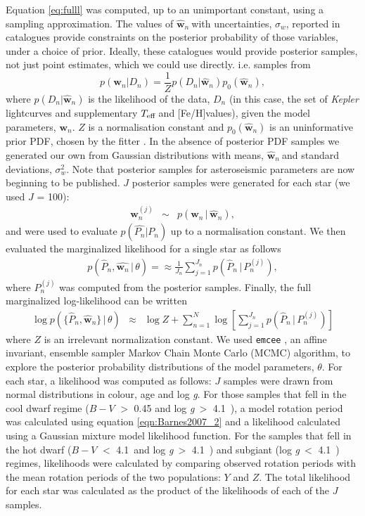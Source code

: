\documentclass[11pt,preprint]{aastex}
\newcommand{\logg}{log \emph{g}}
\newcommand{\teff}{$T_{\rm{eff}}$}
\newcommand{\w}{\mathbf{w}}
\newcommand{\wh}{$\hat{\mathbf{w}}_n$}
\newcommand{\feh}{[Fe/H]}
\newcommand{\subcut}{4.1~}
\begin{document}
Equation \ref{eq:fulll} was computed, up to an unimportant constant, using a sampling approximation.
The values of \wh$~$with uncertainties, $\sigma_w$, reported in catalogues provide constraints on the posterior probability of those variables, under a choice of prior.
Ideally, these catalogues would provide posterior samples, not just point estimates, which we could use directly.
i.e. samples from
\begin{equation}
p(\w_n|D_n) = \frac{1}{Z}p(D_n|\hat{\w}_n)p_0(\hat{\w}_n),
\end{equation}
where $p(D_n|\hat{\w}_n)$ is the likelihood of the data, $D_n$ (in this case, the set of {\it Kepler} lightcurves and supplementary \teff$~$and \feh values), given the model parameters, $\w_n$.
$Z$ is a normalisation constant and $p_0(\hat{\w}_n)$ is an uninformative prior PDF, chosen by the fitter \citep[][used a flat prior in age and \logg]{Chaplin2014}.
In the absence of posterior PDF samples we generated our own from Gaussian distributions with means, \wh$~$and standard deviations, $\sigma_w^2$.
Note that posterior samples for asteroseismic parameters are now beginning to be published.
$J$ posterior samples were generated for each star (we used $J$ = 100):
\begin{eqnarray}
\w_n^{(j)} &\sim& p(\w_n\,|\,\hat{\w}_n),
\end{eqnarray}
and were used to evaluate $p(\hat{P_n}|P_n)$ up to a normalisation constant.
We then evaluated the marginalized likelihood for a single star as follows
\begin{align}
	p(\hat{P}_n,\hat{\w_n}\,|\,\theta) = \approx \frac{1}{J_n} \sum_{j=1}^{J_n}p(\hat{P}_n\,|\,P_n^{(j)}),
\end{align}
where $P_n^{(j)}$ was computed from the posterior samples.
Finally, the full marginalized log-likelihood can be written
\begin{eqnarray}
	\log p(\{\hat{P}_n,\hat{\w}_n\}\,|\,\theta) &\approx&
    \log Z + \sum_{n=1}^N
        \log \left[ \sum_{j=1}^{J_n}p(\hat{P}_n\,|\,P_n^{(j)}) \right ]
\end{eqnarray}
where $Z$ is an irrelevant normalization constant.
We used {\tt emcee} \citep{Foreman-Mackey2013}, an affine invariant, ensemble sampler Markov Chain Monte Carlo (MCMC) algorithm, to explore the posterior probability distributions of the model parameters, $\theta$.
For each star, a likelihood was computed as follows: $J$ samples were drawn from normal distributions in colour, age and \logg.
For those samples that fell in the cool dwarf regime ($B-V$ $>$ 0.45 and \logg$~>$ \subcut), a model rotation period was calculated using equation \ref{eqn:Barnes2007_2} and a likelihood calculated using a Gaussian mixture model likelihood function.
For the samples that fell in the hot dwarf ($B-V$ $<$ \subcut and \logg$~>$ \subcut) and subgiant (\logg$~<$ \subcut) regimes, likelihoods were calculated by comparing observed rotation periods with the mean rotation periods of the two populations: $Y$ and $Z$.
The total likelihood for each star was calculated as the product of the likelihoods of each of the $J$ samples.
\end{document}
